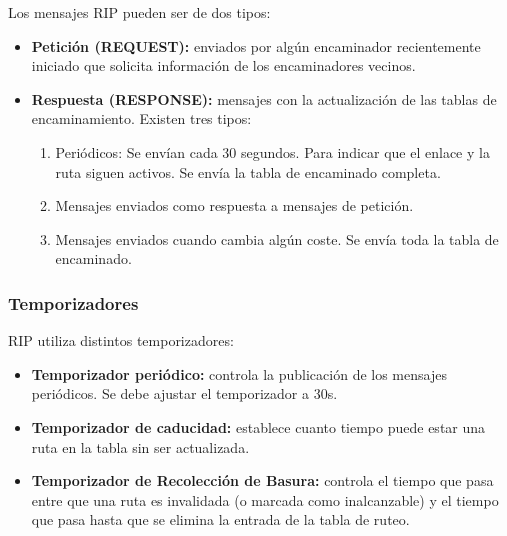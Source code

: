 \begin{onepage}
    Los mensajes RIP pueden ser de dos tipos:
    \begin{itemize}
        \item \textbf{Petición (REQUEST): }enviados por algún encaminador recientemente iniciado que solicita información de los encaminadores vecinos.
        \item \textbf{Respuesta (RESPONSE): }mensajes con la actualización de las tablas de encaminamiento. Existen tres tipos:
        \begin{enumerate}
            \item Periódicos: Se envían cada 30 segundos. Para indicar que el enlace y la ruta siguen activos. Se envía la tabla de encaminado completa.
            \item Mensajes enviados como respuesta a mensajes de petición.
            \item Mensajes enviados cuando cambia algún coste. Se envía toda la tabla de encaminado.
        \end{enumerate}
    \end{itemize}
    \end{onepage}
    \subsubsection{Temporizadores}
    RIP utiliza distintos temporizadores:
    \begin{itemize}
        \item \textbf{Temporizador periódico: }controla la publicación de los mensajes periódicos. Se debe ajustar el temporizador a 30s.
        \item \textbf{Temporizador de caducidad: }establece cuanto tiempo puede estar una ruta en la tabla sin ser actualizada.
        \item \textbf{Temporizador de Recolección de Basura: }controla el tiempo que pasa entre que una ruta es invalidada (o marcada como inalcanzable) y el tiempo que pasa hasta que se elimina la entrada de la tabla de ruteo.
    \end{itemize}

